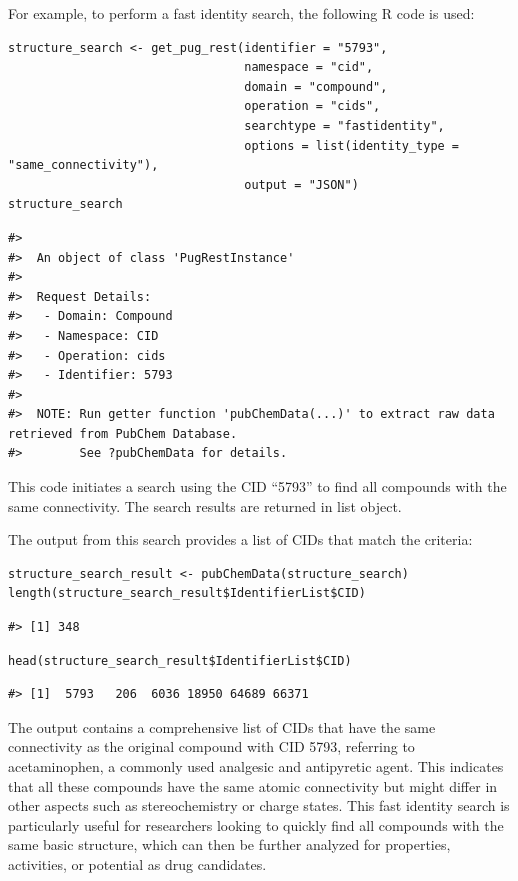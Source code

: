 For example, to perform a fast identity search, the following R code is used:

\begin{verbatim}
structure_search <- get_pug_rest(identifier = "5793", 
                                 namespace = "cid", 
                                 domain = "compound", 
                                 operation = "cids", 
                                 searchtype = "fastidentity", 
                                 options = list(identity_type = "same_connectivity"), 
                                 output = "JSON")
structure_search
\end{verbatim}

\begin{verbatim}
#> 
#>  An object of class 'PugRestInstance'
#> 
#>  Request Details:  
#>   - Domain: Compound
#>   - Namespace: CID
#>   - Operation: cids
#>   - Identifier: 5793
#> 
#>  NOTE: Run getter function 'pubChemData(...)' to extract raw data retrieved from PubChem Database. 
#>        See ?pubChemData for details.
\end{verbatim}

This code initiates a search using the CID ``5793'' to find all compounds with the same connectivity. The search results are returned in list object.

The output from this search provides a list of CIDs that match the criteria:

\begin{verbatim}
structure_search_result <- pubChemData(structure_search)
length(structure_search_result$IdentifierList$CID)
\end{verbatim}

\begin{verbatim}
#> [1] 348
\end{verbatim}

\begin{verbatim}
head(structure_search_result$IdentifierList$CID)
\end{verbatim}

\begin{verbatim}
#> [1]  5793   206  6036 18950 64689 66371
\end{verbatim}

The output contains a comprehensive list of CIDs that have the same connectivity as the original compound with CID 5793, referring to acetaminophen, a commonly used analgesic and antipyretic agent. This indicates that all these compounds have the same atomic connectivity but might differ in other aspects such as stereochemistry or charge states. This fast identity search is particularly useful for researchers looking to quickly find all compounds with the same basic structure, which can then be further analyzed for properties, activities, or potential as drug candidates.

